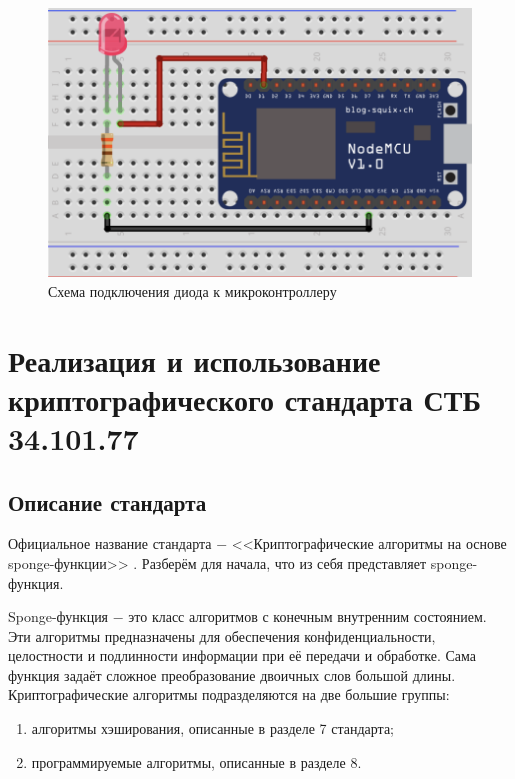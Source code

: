	\begin{figure}[h]
		\centering
		\includegraphics[scale=0.6]{resources/esp8266-control-led}
		\caption{Схема подключения диода к микроконтроллеру}
		\label{fig4.2}
	\end{figure}
	
	
	\section{Реализация и использование криптографического стандарта СТБ 34.101.77}
	
	\subsection{Описание стандарта}
	\label{standard-77-decr}
	
	Официальное название стандарта $-$ <<Криптографические алгоритмы на основе sponge-функции>> \cite{standard-77}.
	Разберём для начала, что из себя представляет sponge-функция.
	
	Sponge-функция $-$ это класс алгоритмов с конечным внутренним состоянием. Эти алгоритмы
	предназначены для обеспечения конфиденциальности, целостности и подлинности информации
	при её передачи и обработке. Сама функция задаёт сложное преобразование двоичных слов большой 
	длины. Криптографические алгоритмы подразделяются на две большие группы:
	
	\begin{enumerate}
		\item алгоритмы хэширования, описанные в разделе 7 стандарта;
		\item программируемые алгоритмы, описанные в разделе 8.
	\end{enumerate}

